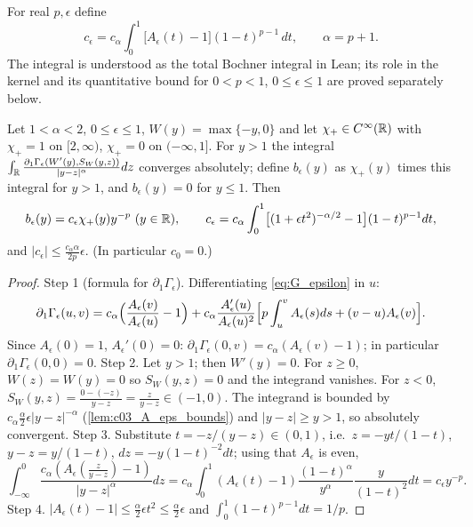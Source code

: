 \begin{definition}
  \label{def:c03_coefficient}
  For real $p,\epsilon$ define
  \[
    c_\epsilon=c_\alpha\int_0^1\bigl[A_\epsilon(t)-1\bigr](1-t)^{p-1}\,dt,
    \qquad \alpha=p+1.
  \]
  The integral is understood as the total Bochner integral in Lean; its role in the kernel and
  its quantitative bound for $0<p<1$, $0\le\epsilon\le1$ are proved separately below.
\end{definition}

\begin{lemma}
  \label{lem:analysis_coefficient}
  Let $1<\alpha<2$, $0\le\epsilon\le1$, $W(y)=\max\{-y,0\}$ and let $\chi_+\in C^\infty(\mathbb{R})$ with $\chi_+=1$ on $[2,\infty)$, $\chi_+=0$ on $(-\infty,1]$.
  For $y>1$ the integral $\int_{\mathbb{R}}\frac{\partial_1\Gamma_\epsilon(W'(y),S_W(y,z))}{|y-z|^\alpha}dz$ converges absolutely; define
  $b_\epsilon(y)$ as $\chi_+(y)$ times this integral for $y>1$, and $b_\epsilon(y)=0$ for $y\le1$. Then
  \[
    b_\epsilon(y)=c_\epsilon\chi_+(y)y^{-p}\ (y\in\R),\qquad
    c_\epsilon=c_\alpha\int_0^1\bigl[(1+\epsilon t^2)^{-\alpha/2}-1\bigr](1-t)^{p-1}dt,
  \]
  and $|c_\epsilon|\le\frac{c_\alpha\alpha}{2p}\epsilon$. (In particular $c_0=0$.)
\end{lemma}
\begin{proof}
  Step 1 (formula for $\partial_1\Gamma_\epsilon$). Differentiating \eqref{eq:G_epsilon} in $u$:
  \begin{equation}\label{eqn:analysis_kernel_first_partial}
  \partial_1\Gamma_\epsilon(u,v)=c_\alpha\Bigl(\frac{A_\epsilon(v)}{A_\epsilon(u)}-1\Bigr)+c_\alpha\frac{A'_\epsilon(u)}{A_\epsilon(u)^2}\Bigl[p\int_u^vA_\epsilon(s)ds+(v-u)A_\epsilon(v)\Bigr].
  \end{equation}
  Since $A_\epsilon(0)=1$, $A_\epsilon'(0)=0$: $\partial_1\Gamma_\epsilon(0,v)=c_\alpha(A_\epsilon(v)-1)$; in particular $\partial_1\Gamma_\epsilon(0,0)=0$.
  Step 2. Let $y>1$; then $W'(y)=0$. For $z\ge0$, $W(z)=W(y)=0$ so $S_W(y,z)=0$ and the integrand vanishes. For $z<0$, $S_W(y,z)=\frac{0-(-z)}{y-z}=\frac{z}{y-z}\in(-1,0)$.
  The integrand is bounded by $c_\alpha\frac\alpha2\epsilon|y-z|^{-\alpha}$ (\cref{lem:c03_A_eps_bounds}) and $|y-z|\ge y>1$, so absolutely convergent.
  Step 3. Substitute $t=-z/(y-z)\in(0,1)$, i.e.\ $z=-yt/(1-t)$, $y-z=y/(1-t)$, $dz=-y(1-t)^{-2}dt$; using that $A_\epsilon$ is even,
  \[
    \int_{-\infty}^0\frac{c_\alpha(A_\epsilon(\frac z{y-z})-1)}{|y-z|^\alpha}dz=c_\alpha\int_0^1(A_\epsilon(t)-1)\frac{(1-t)^\alpha}{y^\alpha}\frac{y}{(1-t)^2}dt=c_\epsilon y^{-p}.
  \]
  Step 4. $|A_\epsilon(t)-1|\le\frac\alpha2\epsilon t^2\le\frac\alpha2\epsilon$ and $\int_0^1(1-t)^{p-1}dt=1/p$.
\end{proof}

